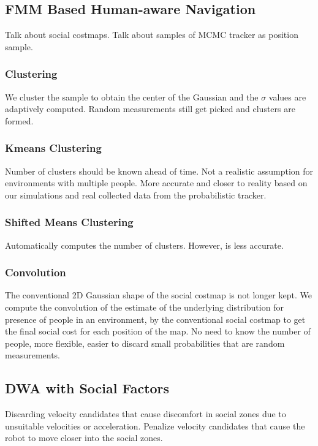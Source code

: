 \subsection{FMM Based Human-aware Navigation}

Talk about social costmaps.
Talk about samples of MCMC tracker as position sample.
\subsubsection{Clustering}
We cluster the sample to obtain the center of the Gaussian and the $\sigma$ values are adaptively computed.
Random measurements still get picked and clusters are formed.

\subsubsection*{Kmeans Clustering}
Number of clusters should be known ahead of time. Not a realistic assumption for environments with multiple people. More accurate and closer to reality based on our simulations and real collected data from the probabilistic tracker.


\subsubsection*{Shifted Means Clustering}
Automatically computes the number of clusters. However, is less accurate. 

\subsubsection{Convolution}
The conventional 2D Gaussian shape of the social costmap is not longer kept. We compute the convolution of the estimate of the underlying distribution for presence of people in an environment, by the conventional social costmap to get the final social cost for each position of the map.
No need to know the number of people, more flexible, easier to discard small probabilities that are random measurements.


\subsection{DWA with Social Factors}
Discarding velocity candidates that cause discomfort in social zones due to unsuitable velocities or acceleration.
Penalize velocity candidates that cause the robot to move closer into the social zones. 